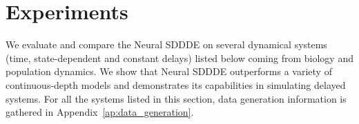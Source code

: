 \documentclass[pmlr]{jmlr}%
\begin{document}
\section{Experiments}\label{sec:experiments}

We evaluate and compare the Neural SDDDE on several dynamical systems (time, state-dependent and constant delays) listed below coming from biology and population dynamics. We show that Neural SDDDE outperforms a variety of continuous-depth models and demonstrates its capabilities in simulating delayed systems. For all the systems listed in this section, data generation information is gathered in Appendix~\ref{ap:data_generation}.


\end{document}
